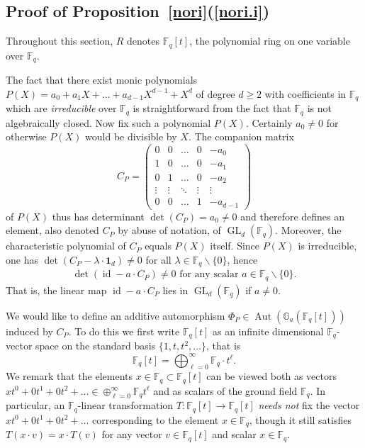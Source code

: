 \documentclass[a4paper,11pt]{amsart}
\numberwithin{equation}{section}
\theoremstyle{plain}
\theoremstyle{definition}
\newcommand{\F}{\mathbb{F}}
\DeclareMathOperator{\GL}{GL} %
\newcommand{\Addi}{\mathbb{G}_{a}} %
\newcommand{\set}[1]{\{ #1 \}}
\newcommand{\mb}{\mathbf}
\newcommand{\dref}[2]{\ref{#1}{\bf(\ref{#2})}} %
\DeclareMathOperator{\Aut}{Aut}
\DeclareMathOperator{\id}{id}
\begin{document}
\subsection{Proof of Proposition~\dref{nori}{nori.i}}\label{fqt}
Throughout this section, $R$ denotes $\F_q[t]$, the polynomial ring on one variable over $\F_q$. 

The fact that there exist monic polynomials $P(X) = a_0 + a_1 X +  \ldots + a_{d-1} X^{d-1} + X^d $ of degree $d \geq 2$ with coefficients in $\F_q$ which are \emph{irreducible} over $\F_q$ is straightforward from the fact that $\F_q$ is not algebraically closed. Now fix such a polynomial $P(X)$. Certainly $a_0 \neq 0$ for otherwise $P(X)$ would be divisible by $X$. The companion matrix 
\[ C_P = \begin{pmatrix} 0 & 0 & \ldots & 0 & -a_0 \\ 1 & 0 & \ldots & 0 & -a_1 \\ 0 & 1 & \ldots & 0 & -a_2 \\ \vdots & \vdots & \ddots & \vdots & \vdots \\ 0 & 0 & \ldots & 1 & -a_{d-1} \end{pmatrix} \]
of $P(X)$ thus has determinant $\det(C_P) = a_0 \neq 0$ and therefore defines an element, also denoted $C_P$ by abuse of notation, of $\GL_{d}(\F_q)$. Moreover, the characteristic polynomial of $C_P$ equals $P(X)$ itself. Since $P(X)$ is irreducible, one has {$\det(C_P - \lambda\cdot\mb{1}_d) \neq 0$} for all $\lambda \in \F_q \backslash \set{0}$, hence
\begin{align} \label{eq:Lula}
{\det(\id - a \cdot C_P) \neq 0} 
\text{ for any scalar } a \in \F_q \backslash \set{0}.
\end{align}
That is, the linear map $\id - a \cdot C_P$ lies in $\GL_d(\F_q)$ if $a \neq 0$.

We would like to define an additive automorphism $\Phi_P \in \Aut(\Addi(\F_q[t]))$ induced by $C_P$. To do this we first write $\F_q[t]$ as an infinite dimensional $\F_q$-vector space on the standard basis $\set{1, t, t^2, \ldots}$, that is 
\[ \F_q[t] = \bigoplus_{\ell=0}^\infty \F_q \cdot t^\ell. \]
We remark that the elements $x \in \F_q \subset \F_q[t]$ can be viewed both as vectors $xt^0+0t^1+0t^2+\ldots \in \oplus_{\ell=0}^\infty \F_q t^\ell$ and as scalars of the ground field $\F_q$. In particular, an $\F_q$-linear transformation $T : \F_q[t] \to \F_q[t]$ \emph{needs not} fix the {vector} $xt^0+0t^1+0t^2+\ldots$ corresponding to the element $x \in \F_q$, though it still satisfies $T(x \cdot v) = x \cdot T(v)$ for any vector $v \in \F_q[t]$ and scalar $x \in \F_q$.
\end{document}
